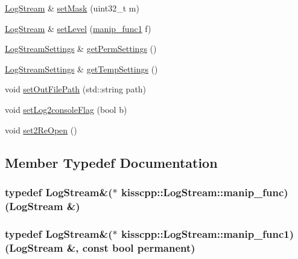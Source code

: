 \begin{DoxyCompactItemize}
\hyperlink{classkisscpp_1_1_log_stream}{Log\-Stream} \& \hyperlink{classkisscpp_1_1_log_stream_a84396dd1702e914bbcd9db9dc1b26194}{set\-Mask} (uint32\-\_\-t m)
\item 
\hyperlink{classkisscpp_1_1_log_stream}{Log\-Stream} \& \hyperlink{classkisscpp_1_1_log_stream_afbccf2eeb34441a14113b29b89c15f88}{set\-Level} (\hyperlink{classkisscpp_1_1_log_stream_ab6994c757d4c63c4388a932cf2be2c9d}{manip\-\_\-func1} f)
\item 
\hyperlink{classkisscpp_1_1_log_stream_settings}{Log\-Stream\-Settings} \& \hyperlink{classkisscpp_1_1_log_stream_a3b4c04dc683fdd8bcf54b3bdcb2906a0}{get\-Perm\-Settings} ()
\item 
\hyperlink{classkisscpp_1_1_log_stream_settings}{Log\-Stream\-Settings} \& \hyperlink{classkisscpp_1_1_log_stream_a7a5c468e5c33c028737a733c7510bc74}{get\-Temp\-Settings} ()
\item 
void \hyperlink{classkisscpp_1_1_log_stream_afb35292a073160d5fc74b1e94512226e}{set\-Out\-File\-Path} (std\-::string path)
\item 
void \hyperlink{classkisscpp_1_1_log_stream_ab9813d6efb18c2533dd0489306af5f3d}{set\-Log2console\-Flag} (bool b)
\item 
void \hyperlink{classkisscpp_1_1_log_stream_a739a620e8f2e957e79cfbdd3e7f58500}{set2\-Re\-Open} ()
\end{DoxyCompactItemize}


\subsection{Member Typedef Documentation}
\hypertarget{classkisscpp_1_1_log_stream_abb058ef2b1b57fb7e0b89c3312794ada}{
\subsubsection[{manip\-\_\-func}]{\setlength{\rightskip}{0pt plus 5cm}typedef {\bf Log\-Stream}\&($\ast$ kisscpp\-::\-Log\-Stream\-::manip\-\_\-func)({\bf Log\-Stream} \&)}}\label{classkisscpp_1_1_log_stream_abb058ef2b1b57fb7e0b89c3312794ada}
\hypertarget{classkisscpp_1_1_log_stream_ab6994c757d4c63c4388a932cf2be2c9d}{
\subsubsection[{manip\-\_\-func1}]{\setlength{\rightskip}{0pt plus 5cm}typedef {\bf Log\-Stream}\&($\ast$ kisscpp\-::\-Log\-Stream\-::manip\-\_\-func1)({\bf Log\-Stream} \&, const bool permanent)}}\label{classkisscpp_1_1_log_stream_ab6994c757d4c63c4388a932cf2be2c9d}


